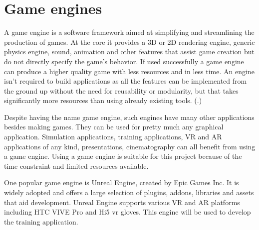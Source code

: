 \documentclass[12pt, a4paper,oneside, nocenter]{thesis}
\renewcommand{\citep}[1]{(\citealp{#1}.)}
\begin{document}
\section{Game engines}
A game engine is a software framework aimed at simplifying and streamlining the production of games. At the core it provides a 3D or 2D rendering engine, generic physics engine, sound, animation and other features that assist game creation but do not directly specify the game's behavior. If used successfully a game engine can produce a higher quality game with less resources and in less time. An engine isn't required to build applications as all the features can be implemented from the ground up without the need for reusability or modularity, but that takes significantly more resources than using already existing tools. \citep{game-engines}
\par
Despite having the name game engine, such engines have many other applications besides making games. They can be used for pretty much any graphical application. Simulation applications, training applications, VR and AR applications of any kind, presentations, cinematography can all benefit from using a game engine. Using a game engine is suitable for this project because of the time constraint and limited resources available. 
\par
One popular game engine is Unreal Engine, created by Epic Games Inc. It is widely adopted and offers a large selection of plugins, addons, libraries and assets that aid development. Unreal Engine supports various VR and AR platforms including HTC VIVE Pro and Hi5 vr gloves. This engine will be used to develop the training application.
\end{document}
